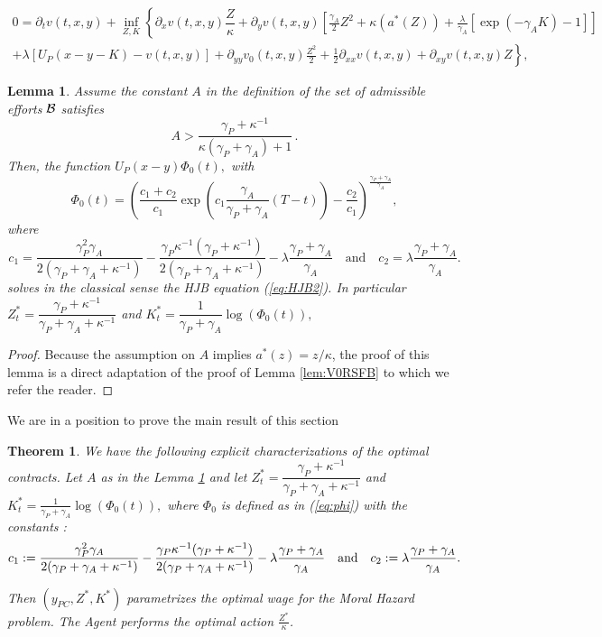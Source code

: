 \documentclass[numbook, envcountsect, envcountsame, envcountreset, runningheads, smallextended]{article}
\newtheorem{Theorem}{Theorem}[part]
\newtheorem{Lemma}{Lemma}[part]
\begin{document}
\begin{align}
\label{eq:HJB2}
0=\partial_t v(t,x,y) + \inf_{Z,K} \left\{ \partial_xv(t,x,y)\dfrac{Z}{\kappa} + \partial_yv(t,x,y) \left[\frac{\gamma_A}{2} Z^2 + \kappa(a^*(Z)) + \frac{\lambda}{\gamma_A} [\exp(-\gamma_A K) - 1]\right] \right. \nonumber\\
\left.+ \lambda \left[ U_P(x-y-K) - v(t,x,y)\right]+ \partial_{yy} v_0(t,x,y) \frac{Z^2}{2} + \frac{1}{2} \partial_{xx} v(t,x,y)+ \partial_{xy}v(t,x,y) Z 
 \right\},
\end{align}

\begin{Lemma}
\label{lem:temp2}
Assume the constant $A$ in the definition of the set of admissible efforts ${\cal B}$ satisfies 
$$
A > \dfrac{\gamma_P + \kappa^{-1}}{\kappa(\gamma_P + \gamma_A) + 1}\,.
$$
Then, the function $U_P(x-y) \Phi_0(t),$
with 
$$\Phi_0(t) = \left(  \frac{c_1 + c_2}{c_1} \exp\left(c_1 \frac{\gamma_A}{\gamma_P + \gamma_A}(T-t)\right) - \frac{c_2}{c_1}\right)^{\frac{\gamma_P+\gamma_A}{\gamma_A}},$$
where 
$$  c_1 = \frac{\gamma_P^2 \gamma_A}{2(\gamma_P+\gamma_A + \kappa^{-1}) } - \frac{\gamma_P \kappa^{-1}(\gamma_P+\kappa^{-1})}{2{(\gamma_P + \gamma_A + \kappa^{-1})}} - \lambda \frac{\gamma_P + \gamma_A}{\gamma_A} \quad \text{and} \quad c_2 = \lambda \frac{\gamma_P + \gamma_A}{\gamma_A}.$$
solves in the classical sense the HJB equation (\ref{eq:HJB2}). In particular $Z^*_t = \dfrac{\gamma_P + \kappa^{-1}}{\gamma_P + \gamma_A + \kappa^{-1}}$ and $K^*_t = \dfrac{1}{\gamma_P + \gamma_A} \log(\Phi_0(t)),$
\end{Lemma}
\begin{proof}
Because the assumption on $A$ implies $a^*(z)=z/\kappa$, the proof of this lemma is a direct adaptation of the proof of Lemma \ref{lem:V0RSFB} to which we refer the reader. 
\end{proof}

We are in a position to prove the main result of this section

\begin{Theorem}
\label{theo:main1}
We have the following explicit characterizations of the optimal contracts. Let $A$ as in the Lemma \ref{lem:temp2} and
let $Z^*_t = \dfrac{\gamma_P + \kappa^{-1}}{\gamma_P + \gamma_A + \kappa^{-1}}$ and 
$ K^*_t = \frac{1}{\gamma_P + \gamma_A} \log(\Phi_0(t)),$
where $\Phi_0$ is defined as in (\ref{eq:phi}) with the constants :  
$$  c_1 := \frac{\gamma_P^2 \gamma_A}{2(\gamma_P+\gamma_A + \kappa^{-1}) } - \frac{\gamma_P \kappa^{-1} (\gamma_P+\kappa^{-1})}{2{(\gamma_P + \gamma_A + \kappa^{-1})}} - \lambda \frac{\gamma_P + \gamma_A}{\gamma_A} \quad \text{and} \quad c_2 := \lambda \frac{\gamma_P + \gamma_A}{\gamma_A}.\\$$

Then $(y_{PC},Z^*,K^*)$ parametrizes the optimal wage for the Moral Hazard problem. The Agent performs the optimal action $\frac{Z^*}{\kappa}$. 

\end{Theorem}
\end{document}
